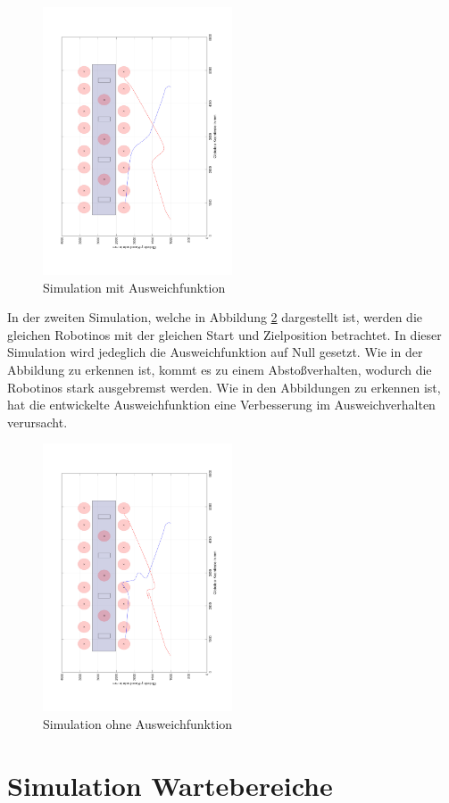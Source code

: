 \begin{figure}
	\centering	\includegraphics[width=0.5\textwidth,angle=-90]{grafiken/SimulationAusweich.pdf}
	\caption{Simulation mit Ausweichfunktion}
	\label{fig:SimulationAusweich}
\end{figure}

 In der zweiten Simulation, welche in Abbildung \ref{fig:SimulationohneAusweich} dargestellt ist, werden die gleichen Robotinos mit der gleichen Start und Zielposition betrachtet. In dieser Simulation wird jedeglich die Ausweichfunktion auf Null gesetzt. Wie in der Abbildung zu erkennen ist, kommt es zu einem Abstoßverhalten, wodurch die Robotinos stark ausgebremst werden. Wie in den Abbildungen zu erkennen ist, hat die entwickelte Ausweichfunktion eine Verbesserung im Ausweichverhalten verursacht.
 
\begin{figure}
	\centering	\includegraphics[width=0.5\textwidth,angle=-90]{grafiken/Simulation_ohne_Ausweich}
	\caption{Simulation ohne Ausweichfunktion}
	\label{fig:SimulationohneAusweich}
\end{figure}
\section{Simulation Wartebereiche}